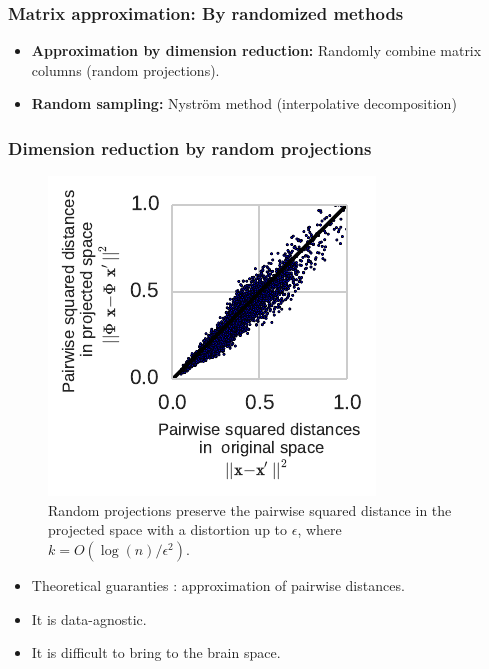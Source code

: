 \documentclass{beamer}
\begin{document}
\begin{frame}\frametitle{\textbf{Matrix approximation:} By randomized methods}

\begin{itemize}
\item \textbf{Approximation by dimension reduction:} Randomly combine matrix 
columns (random projections).
\item \textbf{Random sampling:} Nystr\"om method (interpolative decomposition)
\end{itemize}
\end{frame}


\begin{frame}
\frametitle{\textbf{Dimension reduction by random projections}}

\begin{figure}
\centering
\includegraphics[width=0.4\linewidth]{figures/pairwise_distace.pdf}
\caption{Random projections preserve the pairwise squared distance in the 
projected 
space with a distortion up to $\epsilon$, where $k = O(\log(n)/\epsilon^2).$ }
\end{figure}

\begin{itemize}
\item Theoretical guaranties \cite{Johnson1984}: approximation of pairwise 
distances.
\item It is data-agnostic.
\item It is difficult to bring to the brain space.
\end{itemize}
\end{frame}
\end{document}
